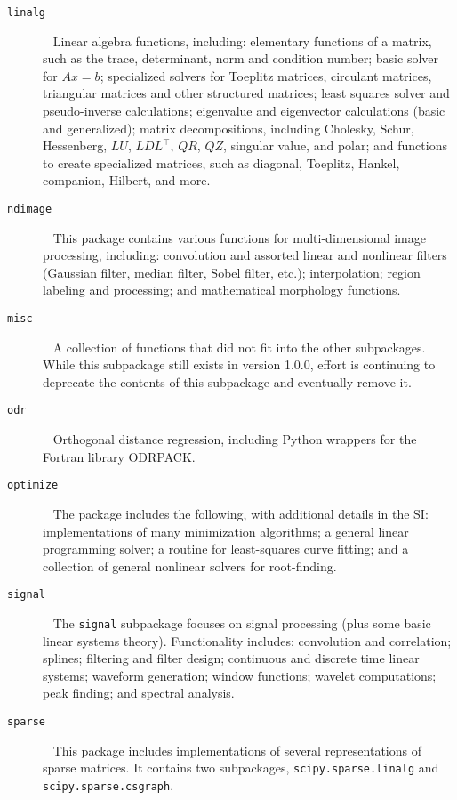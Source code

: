 \begin{description}
\item[\texttt{linalg}] ~ \newline
    Linear algebra functions, including:
    elementary functions of a matrix, such as the trace, determinant, norm and
    condition number;
    basic solver for $Ax = b$;
    specialized solvers for Toeplitz matrices, circulant matrices, triangular
    matrices and other structured matrices; least squares solver and
    pseudo-inverse calculations; eigenvalue and eigenvector calculations
    (basic and generalized); matrix decompositions, including Cholesky, Schur,
    Hessenberg, $LU$, $LDL^{\intercal}$, $QR$, $QZ$, singular value, and polar;
    and functions to create specialized matrices, such as diagonal, Toeplitz,
    Hankel, companion, Hilbert, and more.
\item[\texttt{ndimage}] ~ \newline
    This package contains various functions for multi-dimensional image
    processing, including: convolution and assorted linear and nonlinear
    filters (Gaussian filter, median filter, Sobel filter, etc.);
    interpolation; region labeling and processing; and mathematical morphology
    functions.
\item[\texttt{misc}] ~ \newline
    A collection of functions that did not fit into the other subpackages.
    While this subpackage still exists in version 1.0.0, effort is continuing
    to deprecate the contents of this subpackage and eventually remove it.
\item[\texttt{odr}] ~ \newline
    Orthogonal distance regression, including Python wrappers for the Fortran
    library ODRPACK.
\item[\texttt{optimize}] ~ \newline
    The package includes the following, with additional details in the SI:
    implementations of many minimization algorithms; a general linear
    programming solver; a routine for least-squares curve fitting; and a
    collection of general nonlinear solvers for root-finding.
\item[\texttt{signal}] ~ \newline
    The \texttt{signal} subpackage focuses on signal processing (plus some
    basic linear systems theory).  Functionality includes:
    convolution and correlation; splines; filtering and filter design;
    continuous and discrete time linear systems; waveform generation;
    window functions; wavelet computations; peak finding; and spectral
    analysis.  
\item[\texttt{sparse}] ~ \newline
    This package includes implementations of several representations of
    sparse matrices.  It contains two subpackages, 
    \texttt{scipy.sparse.linalg} and \texttt{scipy.sparse.csgraph}.


\end{description}
